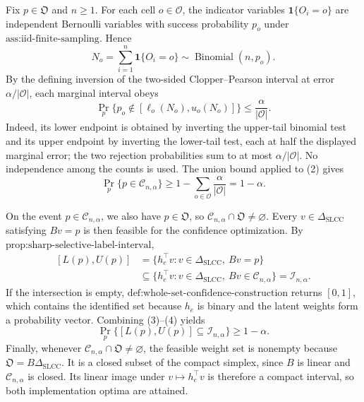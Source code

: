 Fix \(p\in\mathfrak O\) and \(n\geq1\).  For each cell \(o\in\mathcal O\), the indicator variables \(\mathbf 1\{O_i=o\}\) are independent Bernoulli variables with success probability \(p_o\) under \(\text{ass:iid-finite-sampling}\).  Hence
\[
N_o=\sum_{i=1}^n\mathbf 1\{O_i=o\}\sim\operatorname{Binomial}(n,p_o).
\tag{1}
\]
By the defining inversion of the two-sided Clopper--Pearson interval at error \(\alpha/|\mathcal O|\), each marginal interval obeys
\[
\Pr_p\{p_o\notin[\ell_o(N_o),u_o(N_o)]\}
\leq\frac{\alpha}{|\mathcal O|}.
\tag{2}
\]
Indeed, its lower endpoint is obtained by inverting the upper-tail binomial test and its upper endpoint by inverting the lower-tail test, each at half the displayed marginal error; the two rejection probabilities sum to at most \(\alpha/|\mathcal O|\).  No independence among the counts is used.  The union bound applied to (2) gives
\[
\Pr_p\{p\in\mathcal C_{n,\alpha}\}
\geq1-\sum_{o\in\mathcal O}\frac{\alpha}{|\mathcal O|}
=1-\alpha.
\tag{3}
\]

On the event \(p\in\mathcal C_{n,\alpha}\), we also have \(p\in\mathfrak O\), so \(\mathcal C_{n,\alpha}\cap\mathfrak O\neq\varnothing\).  Every \(v\in\Delta_{\mathrm{SLCC}}\) satisfying \(Bv=p\) is then feasible for the confidence optimization.  By \(\text{prop:sharp-selective-label-interval}\),
\[
\begin{aligned}
[L(p),U(p)]
&=\{h_e^{\top}v:v\in\Delta_{\mathrm{SLCC}},\ Bv=p\}\\
&\subseteq
\{h_e^{\top}v:v\in\Delta_{\mathrm{SLCC}},\ Bv\in\mathcal C_{n,\alpha}\}
=\mathcal I_{n,\alpha}.
\end{aligned}
\tag{4}
\]
If the intersection is empty, \(\text{def:whole-set-confidence-construction}\) returns \([0,1]\), which contains the identified set because \(h_e\) is binary and the latent weights form a probability vector.  Combining (3)--(4) yields
\[
\Pr_p\{[L(p),U(p)]\subseteq\mathcal I_{n,\alpha}\}\geq1-\alpha.
\]
Finally, whenever \(\mathcal C_{n,\alpha}\cap\mathfrak O\neq\varnothing\), the feasible weight set is nonempty because \(\mathfrak O=B\Delta_{\mathrm{SLCC}}\).  It is a closed subset of the compact simplex, since \(B\) is linear and \(\mathcal C_{n,\alpha}\) is closed.  Its linear image under \(v\mapsto h_e^{\top}v\) is therefore a compact interval, so both implementation optima are attained.